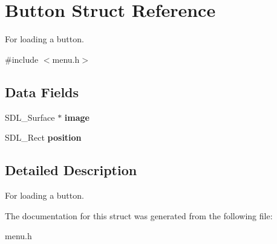 \hypertarget{structButton}{}\section{Button Struct Reference}
\label{structButton}


For loading a button.  




{\ttfamily \#include $<$menu.\+h$>$}

\subsection*{Data Fields}
\begin{DoxyCompactItemize}
\item 
\mbox{\label{structButton_a9b46ba5cac45b47ada9d1491ffff575d}} 
S\+D\+L\+\_\+\+Surface $\ast$ {\bfseries image}
\item 
\mbox{\label{structButton_a0343ba330902623017b8915e2d629a83}} 
S\+D\+L\+\_\+\+Rect {\bfseries position}
\end{DoxyCompactItemize}


\subsection{Detailed Description}
For loading a button. 

The documentation for this struct was generated from the following file\+:\begin{DoxyCompactItemize}
\item 
menu.\+h\end{DoxyCompactItemize}
